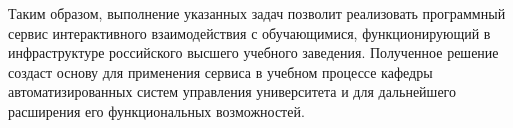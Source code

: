 Таким образом, выполнение указанных задач позволит реализовать
программный сервис интерактивного взаимодействия с обучающимися,
функционирующий в инфраструктуре российского высшего учебного
заведения. Полученное решение создаст основу для применения сервиса
в учебном процессе кафедры автоматизированных систем управления
университета и для дальнейшего расширения
его функциональных возможностей.

\newpage

